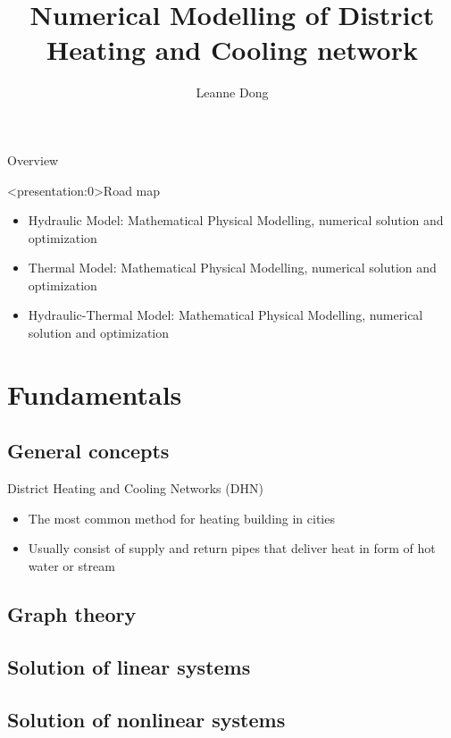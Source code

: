 \documentclass[xcolor=dvipsnames]{beamer}
\title{Numerical Modelling of District Heating and Cooling network}
\author{Leanne Dong}
\begin{document}
\begin{frame}
\titlepage
\end{frame}
\begin{frame}{Overview}
\tableofcontents
\end{frame}


\begin{frame}<presentation:0>{Road map}
	\begin{itemize}
		\item {\color{purple}Hydraulic} Model: Mathematical Physical Modelling, numerical solution and optimization
		\item {\color{purple}Thermal} Model: Mathematical Physical Modelling, numerical solution and optimization
		\item {\color{purple}Hydraulic-Thermal} Model: Mathematical Physical Modelling, numerical solution and optimization
	\end{itemize}
\end{frame}
\section{Fundamentals}

\subsection{General concepts}
\begin{frame}{District Heating and Cooling Networks (DHN)}
\begin{itemize}
	\item The most common method for heating building in cities
	\item Usually consist of supply and return pipes that deliver heat in form of hot water or stream
\end{itemize}
\end{frame}

\subsection{Graph theory}

\subsection{Solution of linear systems}

\subsection{Solution of nonlinear systems}
\end{document}
